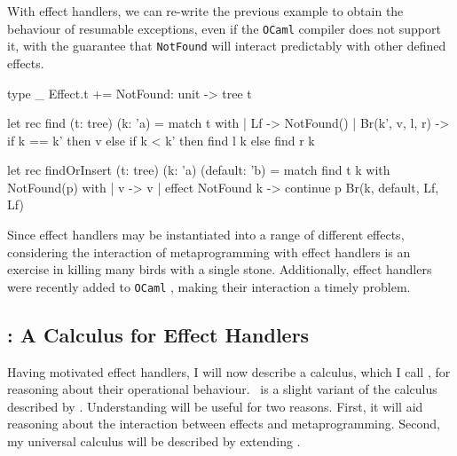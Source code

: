 With effect handlers, we can re-write the previous example to obtain the behaviour of resumable exceptions, even if the \texttt{OCaml} compiler does not support it, with the guarantee that \texttt{NotFound} will interact predictably with other defined effects.
\begin{ocaml}
type _ Effect.t += NotFound: unit -> tree t

let rec find (t: tree) (k: 'a) = match t with 
  | Lf -> NotFound()
  | Br(k', v, l, r) -> if k == k' then v 
                      else if k < k' then find l k
                            else find r k

let rec findOrInsert (t: tree) (k: 'a) (default: 'b) = 
  match find t k with NotFound(p) with 
  | v -> v
  | effect NotFound k -> continue p Br(k, default, Lf, Lf)
\end{ocaml}

Since effect handlers may be instantiated into a range of different effects, considering the interaction of metaprogramming with effect handlers is an exercise in killing many birds with a single stone. Additionally, effect handlers were recently added to \texttt{OCaml} \citep{sivaramakrishnan-21}, making their interaction a timely problem. 
\subsection{\texorpdfstring{\efflang{}}{Lambda-Op}: A Calculus for Effect Handlers}\label{subsection:effect-handler-calculus}
\newcommand{\print}[1]{\texttt{\textbf{print}(#1)}}
\newcommand{\readInt}[1]{\texttt{\textbf{read\_int}(#1)}}


Having motivated effect handlers, I will now describe a calculus, which I call \efflang{}, for reasoning about their operational behaviour.\ \efflang{} is a slight variant of the calculus described by \citet{pretnar-15}. Understanding \efflang{} will be useful for two reasons. First, it will aid reasoning about the interaction between effects and metaprogramming. Second, my universal calculus will be described by extending \efflang{}. 

